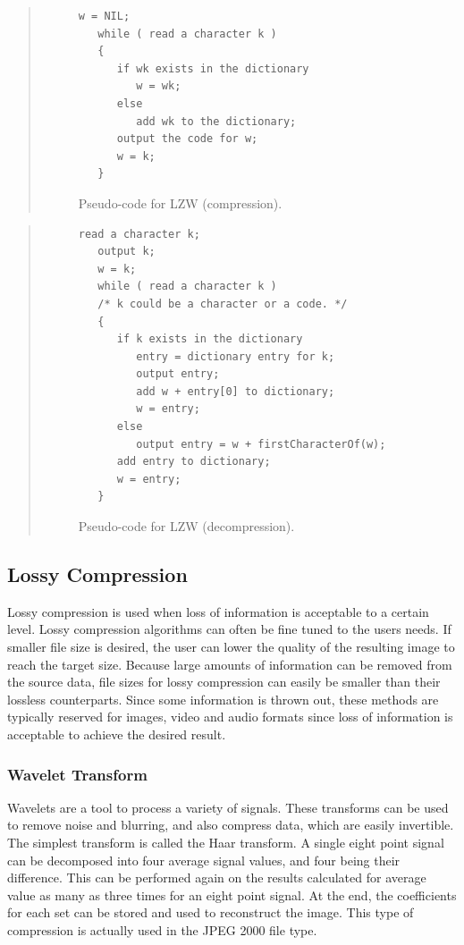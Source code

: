 \documentclass[12pt]{CPP}
\begin{document}
\begin{quote}
\begin{figure}[!htbp]
\vspace{-20pt}
\begin{verbatim}
w = NIL;
   while ( read a character k )
   {
      if wk exists in the dictionary
         w = wk;
      else
         add wk to the dictionary;
      output the code for w;
      w = k;
   }
\end{verbatim}
\vspace{-20pt}
\caption{Pseudo-code for LZW (compression).}
\end{figure}
\end{quote}

\begin{quote}
\begin{figure}[!htbp]
\begin{verbatim}
read a character k;
   output k;
   w = k;
   while ( read a character k )
   /* k could be a character or a code. */
   {
      if k exists in the dictionary
         entry = dictionary entry for k;
         output entry;
         add w + entry[0] to dictionary;
         w = entry;
      else
         output entry = w + firstCharacterOf(w);
      add entry to dictionary;
      w = entry;
   }
\end{verbatim}
\vspace{-20pt}
\caption{Pseudo-code for LZW (decompression).}
\vspace{-20pt}
\end{figure}
\end{quote}

\subsection{Lossy Compression}
Lossy compression is used when loss of information is acceptable to a certain level. Lossy compression algorithms can often be fine tuned to the users needs. If smaller file size is desired, the user can lower the quality of the resulting image to reach the target size. Because large amounts of information can be removed from the source data, file sizes for lossy compression can easily be smaller than their lossless counterparts. Since some information is thrown out, these methods are typically reserved for images, video and audio formats since loss of information is acceptable to achieve the desired result.

\subsubsection{Wavelet Transform}
Wavelets are a tool to process a variety of signals. These transforms can be used to remove noise and blurring, and also compress data, which are easily invertible. The simplest transform is called the Haar transform. A single eight point signal can be decomposed into four average signal values, and four being their difference. This can be performed again on the results calculated for average value as many as three times for an eight point signal. At the end, the coefficients for each set can be stored and used to reconstruct the image. This type of compression is actually used in the JPEG 2000 file type. \citep{Chui}
\end{document}
